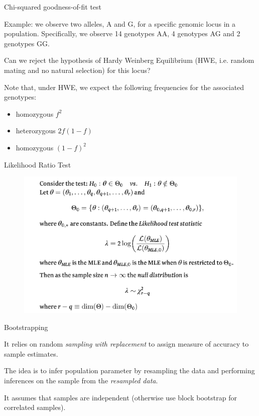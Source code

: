 \documentclass{beamer}
\begin{document}
\begin{frame}{Chi-squared goodness-of-fit test}

	Example: we observe two alleles, A and G, for a specific genomic locus in a population.
	Specifically, we observe 14 genotypes AA, 4 genotypes AG and 2 genotypes GG.

	Can we reject the hypothesis of Hardy Weinberg Equilibrium (HWE, i.e. random mating and no natural selection) for this locus?

	Note that, under HWE, we expect the following frequencies for the associated genotypes:
	\begin{itemize}
		\item homozygous $f^2$
		\item heterozygous $2f(1-f)$
		\item homozygous $(1-f)^2$
	\end{itemize}

\end{frame}

\begin{frame}{Likelihood Ratio Test}
	\begin{figure}
        	\includegraphics[width=0.85\linewidth]{lrt.png}
	\end{figure}
\end{frame}

\begin{frame}{Bootstrapping}

	It relies on random \textit{sampling with replacement} to assign measure
	of accuracy to sample estimates.

	\vskip 1cm

	The idea is to infer population parameter by resampling the data and performing
	inferences on the sample from the \textit{resampled data}.

	\vskip 1cm

	It assumes that samples are independent (otherwise use block bootstrap for correlated samples).

\end{frame}
\end{document}
